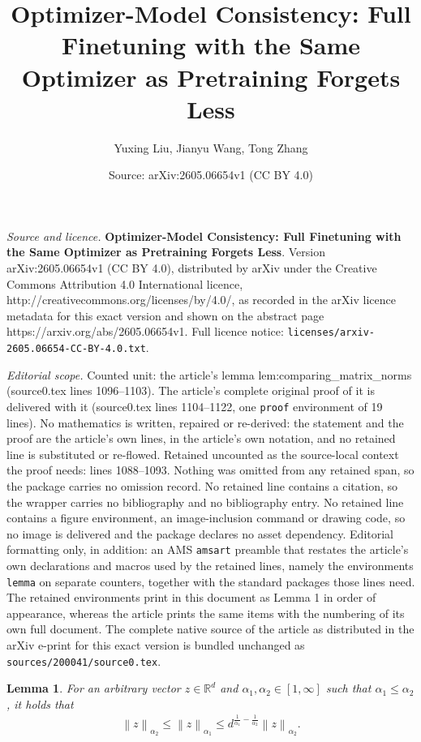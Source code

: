 \documentclass[10pt,a4paper]{amsart}
\title{\textbf{Optimizer-Model Consistency: Full Finetuning with the Same Optimizer as Pretraining Forgets Less}}
\author{Yuxing Liu, Jianyu Wang, Tong Zhang}
\date{Source: arXiv:2605.06654v1 (CC BY 4.0)}
\newtheorem{lemma}{Lemma}
\newcommand{\Norm}[1]{\left\|#1\right\|}
\newcommand{\RR}{\mathbb{R}}
\begin{document}
\maketitle

\noindent\emph{Source and licence.} \textbf{Optimizer-Model Consistency: Full Finetuning with the Same Optimizer as Pretraining Forgets Less}. Version arXiv:2605.06654v1 (CC BY 4.0), distributed by arXiv under the Creative Commons Attribution 4.0 International licence, http://creativecommons.org/licenses/by/4.0/, as recorded in the arXiv licence metadata for this exact version and shown on the abstract page https://arxiv.org/abs/2605.06654v1. Full licence notice: \texttt{licenses/arxiv-2605.06654-CC-BY-4.0.txt}.\par\smallskip

\noindent\textit{Editorial scope.} Counted unit: the article's lemma lem:comparing\_matrix\_norms (source0.tex lines 1096--1103). The article's complete original proof of it is delivered with it (source0.tex lines 1104--1122, one \texttt{proof} environment of 19 lines). No mathematics is written, repaired or re-derived: the statement and the proof are the article's own lines, in the article's own notation, and no retained line is substituted or re-flowed.  Retained uncounted as the source-local context the proof needs: lines 1088--1093.  Nothing was omitted from any retained span, so the package carries no omission record.  No retained line contains a citation, so the wrapper carries no bibliography and no bibliography entry.  No retained line contains a figure environment, an image-inclusion command or drawing code, so no image is delivered and the package declares no asset dependency.  Editorial formatting only, in addition: an AMS \texttt{amsart} preamble that restates the article's own declarations and macros used by the retained lines, namely the environments \texttt{lemma} on separate counters, together with the standard packages those lines need.  The retained environments print in this document as Lemma 1 in order of appearance, whereas the article prints the same items with the numbering of its own full document.  The complete native source of the article as distributed in the arXiv e-print for this exact version is bundled unchanged as \texttt{sources/200041/source0.tex}.
\begin{lemma}\label{lem:comparison_vector_norms}
    For an arbitrary vector $z \in \RR^d$ and $\alpha_1,\alpha_2 \in [1,\infty]$ such that $\alpha_1 \le \alpha_2$, it holds that
    \begin{align*}
        \Norm{z}_{\alpha_2} \le \Norm{z}_{\alpha_1} \le d^{\frac{1}{\alpha_1} - \frac{1}{\alpha_2}}\Norm{z}_{\alpha_2} .
    \end{align*}
\end{lemma}
\end{document}
